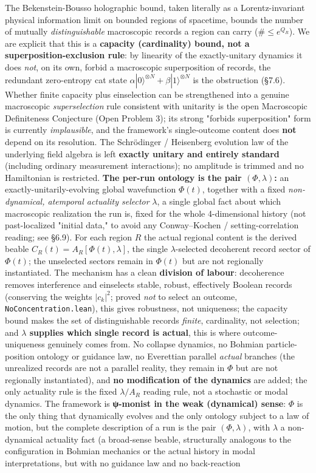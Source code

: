 \documentclass[11pt,a4paper]{article}
\newenvironment{qiqtquote}{\begin{mdframed}[style=quotestyle]}{\end{mdframed}}
\begin{document}
\begin{qiqtquote}
The Bekenstein-Bousso holographic bound, taken literally as a Lorentz-invariant physical information limit on bounded regions of spacetime, bounds the number of mutually \emph{distinguishable} macroscopic records a region can carry ($\# \le e^{Q_R}$). We are explicit that this is a \textbf{capacity (cardinality) bound, not a superposition-exclusion rule}: by linearity of the exactly-unitary dynamics it does \emph{not}, on its own, forbid a macroscopic superposition of records, the redundant zero-entropy cat state $\alpha|0\rangle^{\otimes N}+\beta|1\rangle^{\otimes N}$ is the obstruction (§7.6). Whether finite capacity plus einselection can be strengthened into a genuine macroscopic \emph{superselection} rule consistent with unitarity is the open Macroscopic Definiteness Conjecture (Open Problem 3); its strong "forbids superposition" form is currently \emph{implausible}, and the framework's single-outcome content does \textbf{not} depend on its resolution. The Schrödinger / Heisenberg evolution law of the underlying field algebra is left \textbf{exactly unitary and entirely standard} (including ordinary measurement interactions); no amplitude is trimmed and no Hamiltonian is restricted. \textbf{The per-run ontology is the pair $(\Phi, \lambda)$:} an exactly-unitarily-evolving global wavefunction $\Phi(t)$, together with a fixed \emph{non-dynamical, atemporal actuality selector} $\lambda$, a single global fact about which macroscopic realization the run is, fixed for the whole 4-dimensional history (not past-localized "initial data," to avoid any Conway–Kochen / setting-correlation reading; see §6.9). For each region $R$ the actual regional content is the derived beable $C_R(t) = A_R[\Phi(t), \lambda]$, the single $\lambda$-selected decoherent record sector of $\Phi(t)$; the unselected sectors remain in $\Phi(t)$ but are not regionally instantiated. The mechanism has a clean \textbf{division of labour}: decoherence removes interference and einselects stable, robust, effectively Boolean records (conserving the weights $|c_k|^2$; proved \emph{not} to select an outcome, \texttt{NoConcentration.lean}), this gives robustness, not uniqueness; the capacity bound makes the set of distinguishable records \emph{finite}, cardinality, not selection; and \textbf{$\lambda$ supplies which single record is actual}, this is where outcome-uniqueness genuinely comes from. No collapse dynamics, no Bohmian particle-position ontology or guidance law, no Everettian parallel \emph{actual} branches (the unrealized records are not a parallel reality, they remain in $\Phi$ but are not regionally instantiated), and \textbf{no modification of the dynamics} are added; the only actuality rule is the fixed $\lambda / A_R$ reading rule, not a stochastic or modal dynamics. The framework is \textbf{ψ-monist in the weak (dynamical) sense}: $\Phi$ is the only thing that dynamically evolves and the only ontology subject to a law of motion, but the complete description of a run is the pair $(\Phi, \lambda)$, with $\lambda$ a non-dynamical actuality fact (a broad-sense beable, structurally analogous to the configuration in Bohmian mechanics or the actual history in modal interpretations, but with no guidance law and no back-reaction 
\end{qiqtquote}
\end{document}
